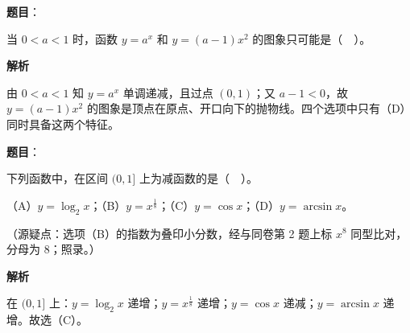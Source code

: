 \begin{answer}

\textbf{题目}：

当 $0<a<1$ 时，函数 $y=a^{x}$ 和 $y=(a-1)x^{2}$ 的图象只可能是（　）。
\nopagebreak[4]
\begin{center}\end{center}
\nopagebreak[4]
\textbf{解析}

由 $0<a<1$ 知 $y=a^{x}$ 单调递减，且过点 $(0,1)$；又 $a-1<0$，故 $y=(a-1)x^{2}$ 的图象是顶点在原点、开口向下的抛物线。四个选项中只有（D）同时具备这两个特征。


\end{answer}
\begin{answer}

\textbf{题目}：

下列函数中，在区间 $(0,1]$ 上为减函数的是（　）。

（A）$y=\log_{2}x$；（B）$y=x^{\frac{1}{8}}$；（C）$y=\cos x$；（D）$y=\arcsin x$。

（源疑点：选项（B）的指数为叠印小分数，经与同卷第 2 题上标 $x^8$ 同型比对，分母为 $8$；照录。）

\textbf{解析}

在 $(0,1]$ 上：$y=\log_{2}x$ 递增；$y=x^{\frac{1}{8}}$ 递增；$y=\cos x$ 递减；$y=\arcsin x$ 递增。故选（C）。


\end{answer}
